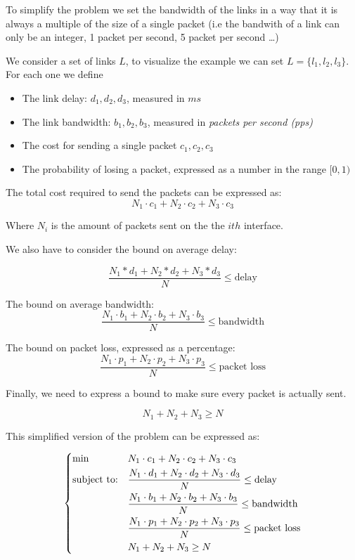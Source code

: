 	To simplify the problem we set the bandwidth of the links in a way that it is always a multiple of the size of a single packet (i.e the bandwith of a link can only be an integer, 1 packet per second, 5 packet per second \dots)
	
	
	We consider a set of links $L$, to visualize the example we can set  $L = \{l_1, l_2, l_3 \}$. \\
	
	For each one we define
	\begin{itemize}
		\item The link delay:  $d_1, d_2, d_3$, measured in $ms$
		\item The link bandwidth: $b_1, b_2, b_3$, measured in \textit{packets per second (pps)}
		\item The cost for sending a single packet $c_1, c_2, c_3$
		\item The probability of losing a packet, expressed as a number in the range $ [0, 1)$
	\end{itemize}
	
	The total cost required to send the packets can be expressed as:
	\[
	N_1 \cdot c_1 +
	N_2 \cdot c_2 +
	N_3 \cdot c_3 
	\]
	
	Where $N_i$ is the amount of packets sent on the the $ith$ interface.
	
	We also have to consider the bound on average delay:
	
	\[
	\frac
	{N_1 * d_1 + N_2 * d_2  + N_3 * d_3 }
	{N}
	\le \text{delay}
	\]
	
	The bound on average bandwidth:
	\[
	\frac
	{N_1 \cdot b_1 + N_2 \cdot b_2  + N_3 \cdot b_3 }
	{N}
	\le \text{bandwidth}
	\]
	
	The bound on packet loss, expressed as a percentage:
	\[
	\frac
	{N_1 \cdot p_1 + N_2 \cdot p_2 + N_3 \cdot p_3 }
	{N}
	\le \text{packet loss}
	\]
	
	Finally, we need to express a bound to make sure every packet is actually sent.
	
	\[
	N_1 + N_2 + N_3 \ge N
	\]
	
	This simplified version of the problem can be expressed as: 
	
	\begin{equation}\label{eq:linear_formulation_final}
		\begin{dcases}
			\begin{aligned}
				& {\text{min}}
				& & N_1 \cdot c_1 + N_2 \cdot c_2 +	N_3 \cdot c_3 \\
				& \text{subject to:}
				& & \frac
				{N_1 \cdot d_1 + N_2 \cdot d_2  + N_3 \cdot d_3 }
				{N}
				\le \text{delay} \\
				& & & \frac
				{N_1 \cdot b_1 + N_2 \cdot b_2  + N_3 \cdot b_3 }
				{N}
				\le \text{bandwidth} \\
				& & & \frac
				{N_1 \cdot p_1 + N_2 \cdot p_2 + N_3 \cdot p_3 }
				{N}
				\le \text{packet loss} \\
				& & &
				N_1 + N_2 + N_3 \ge N
			\end{aligned}
		\end{dcases}
	\end{equation}
	
